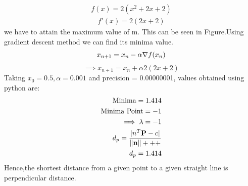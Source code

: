 \documentclass[10pt, a4paper]{article}
\let\vec\mathbf
\begin{document}
    \begin{align}
	\label{eq:vol_varx}
	f(x) = 2(x^2+2x+2)
\end{align}
\begin{align}   
    f'(x) = 2(2x+2)
	\end{align}
we have to attain the maximum value of m. This can be seen in Figure.Using gradient descent method we can find its minima value.
\begin{equation}
        x_{n+1} = x_n - \alpha \nabla f(x_n) \\
\end{equation}
\vspace{1mm}
\begin{equation}
\implies x_{n+1}=x_n+\alpha2(2x+2)
\end{equation}
Taking $x_0=0.5,\alpha=0.001$ and precision = 0.00000001, values obtained using python are:
    \begin{align}
        \text{Minima} = 1.414\\        
        \text{Minima Point} = -1\\
        \implies \lambda=-1\\
         d_p=\frac{|n^T\vec{P}-c|}{\norm{\vec{n}}+++}\\
         d_p = 1.414 
    \end{align}
Hence,the shortest distance from a given point to a given straight line is perpendicular distance.    
   
\end{document}
